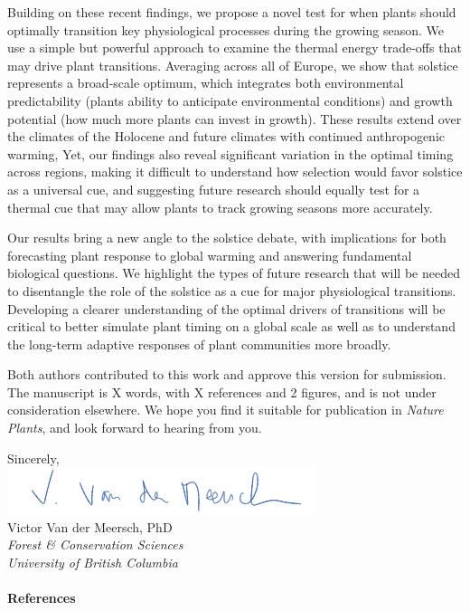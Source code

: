 \documentclass[11pt,a4paper]{article}
\begin{document}
\noindent Building on these recent findings, we propose a novel test for when plants should optimally transition key physiological processes during the growing season. We use a simple but powerful approach to  examine the thermal energy trade-offs that may drive plant transitions. %
Averaging across all of Europe, we show that solstice represents a broad-scale optimum, which integrates both environmental predictability (plants ability to anticipate environmental conditions) and growth potential (how much more plants can invest in growth). These results extend over the climates of the Holocene and future climates with continued anthropogenic warming, Yet, our findings also reveal significant variation in the optimal timing across regions, making it difficult to understand how selection would favor solstice as a universal cue, and suggesting future research should equally test for a thermal cue that may allow plants to track growing seasons more accurately.

\vspace{0.25cm}

\noindent Our results bring a new angle to the solstice debate, with implications for both forecasting plant response to global warming and answering fundamental biological questions. We highlight the types of future research that will be needed to disentangle the role of the solstice as a cue for major physiological transitions. Developing a clearer understanding of the optimal drivers of transitions will be critical to better simulate plant timing on a global scale as well as to understand the long-term adaptive responses of plant communities more broadly. 

\vspace{0.25cm}

\noindent Both authors contributed to this work and approve this version for submission. The manuscript is X words, with X references and 2 figures, and is not under consideration elsewhere. We hope you find it suitable for publication in \emph{Nature Plants}, and look forward to hearing from you. 

\vspace{0.45cm}
\noindent Sincerely, 
\vspace{0.35cm}\\
\hspace*{-0.5cm}
\includegraphics[scale=.65]{sign_long.png} \\
\noindent Victor Van der Meersch, PhD\\
\noindent \emph{Forest \& Conservation Sciences}\\
\noindent \emph{University of British Columbia}

\clearpage

\paragraph{References}
\printbibliography[heading=none]


\newpage
\end{document}
